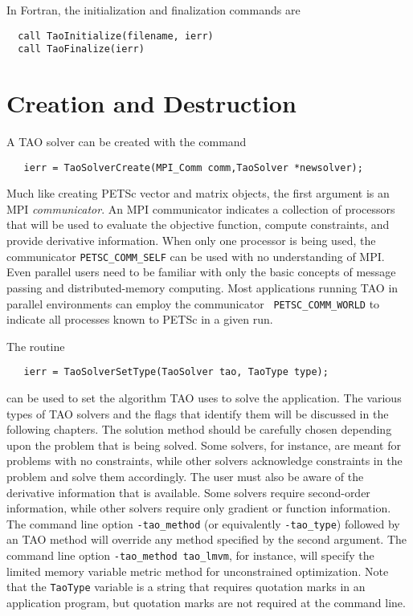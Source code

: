 In Fortran, the initialization and finalization commands are
\begin{verbatim}
  call TaoInitialize(filename, ierr)
  call TaoFinalize(ierr)
\end{verbatim}

\section{Creation and Destruction}

A TAO solver can be created with
the command 
\begin{verbatim}
   ierr = TaoSolverCreate(MPI_Comm comm,TaoSolver *newsolver);
\end{verbatim}
\noindent
Much like creating PETSc vector and matrix objects, 
the first argument is an MPI {\em communicator}.
An MPI \cite{using-mpi} communicator
indicates a collection of processors that will be used to evaluate the
objective function, compute constraints, and provide derivative information.
When only one processor is being used, the communicator {\tt PETSC\_COMM\_SELF}
can be used with no understanding of MPI.
Even parallel users need to be familiar with only the basic concepts 
of message passing and  distributed-memory computing. 
Most applications running TAO in
parallel environments can employ the communicator {\tt
PETSC\_COMM\_WORLD} to indicate all processes known to PETSc in a given run.

The routine
\begin{verbatim}
   ierr = TaoSolverSetType(TaoSolver tao, TaoType type);
\end{verbatim}
\noindent
can be used to set the algorithm TAO uses to solve the application.
The various types of TAO solvers and the flags that identify them 
will be discussed in the following chapters.
The solution method should be carefully chosen depending upon
the problem that is being solved.  Some solvers, for instance, are meant for
problems with no constraints, while other solvers acknowledge constraints
in the problem and solve them accordingly.
The user must also be aware of the derivative information that is available.
Some solvers require second-order information, while other solvers require
only gradient or function information.
The command line option \texttt{-tao\_method} (or equivalently 
\texttt{-tao\_type}) followed by an TAO method
will override any method specified by the second argument.
The command line option {\tt -tao\_method tao\_lmvm}, for instance,
will specify the limited memory variable metric method for unconstrained
optimization.  Note that the {\tt TaoType} variable is a string that requires
quotation marks in an application program, but quotation marks are not required
at the command line.

